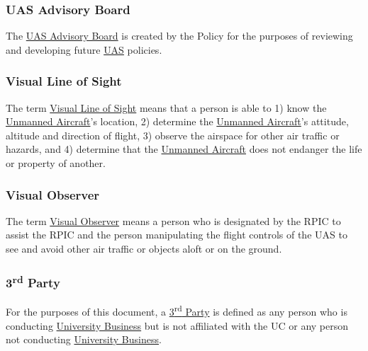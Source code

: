 \documentclass[
]{book}
\begin{document}
\hypertarget{AB}{%
\subsubsection*{UAS Advisory Board}\label{AB}}

The \protect\hyperlink{AB}{UAS Advisory Board} is created by the Policy for the purposes of reviewing and developing future \protect\hyperlink{UAS}{UAS} policies.



\hypertarget{VLOS}{%
\subsubsection*{Visual Line of Sight}\label{VLOS}}

The term \protect\hyperlink{VLOS}{Visual Line of Sight} means that a person is able to 1) know the \protect\hyperlink{UA}{Unmanned Aircraft}'s location, 2) determine the \protect\hyperlink{UA}{Unmanned Aircraft}'s attitude, altitude and direction of flight, 3) observe the airspace for other air traffic or hazards, and 4) determine that the \protect\hyperlink{UA}{Unmanned Aircraft} does not endanger the life or property of another.





\hypertarget{VO}{%
\subsubsection*{Visual Observer}\label{VO}}

The term \protect\hyperlink{VO}{Visual Observer} means a person who is designated by the RPIC to assist the RPIC and the person manipulating the flight controls of the UAS to see and avoid other air traffic or objects aloft or on the ground.





\hypertarget{rdparty}{%
\subsubsection*{\texorpdfstring{3\textsuperscript{rd} Party}{3rd Party}}\label{rdparty}}

For the purposes of this document, a \protect\hyperlink{rdparty}{3\textsuperscript{rd} Party} is defined as any person who is conducting \protect\hyperlink{UB}{University Business} but is not affiliated with the UC or any person not conducting \protect\hyperlink{UB}{University Business}.



  
\end{document}
